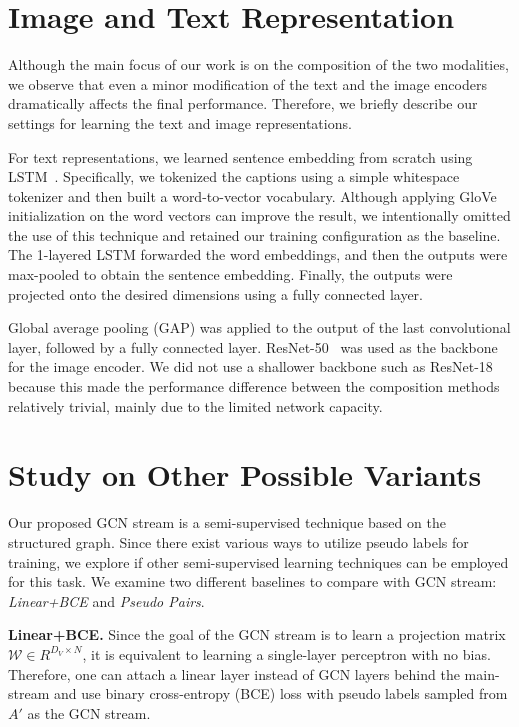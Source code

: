 \documentclass[10pt,twocolumn,letterpaper]{article}
\begin{document}
\section{Image and Text Representation}
Although the main focus of our work is on the composition of the two modalities, we observe that even a minor modification of the text and the image encoders dramatically affects the final performance. Therefore, we briefly describe our settings for learning the text and image representations.

For text representations, we learned sentence embedding from scratch using LSTM~\cite{hochreiter1997long}. Specifically, we tokenized the captions using a simple whitespace tokenizer and then built a word-to-vector vocabulary. Although applying GloVe~\cite{pennington2014glove} initialization on the word vectors can improve the result, we intentionally omitted the use of this technique and retained our training configuration as the baseline. The 1-layered LSTM forwarded the word embeddings, and then the outputs were max-pooled to obtain the sentence embedding. Finally, the outputs were projected onto the desired dimensions using a fully connected layer.

Global average pooling (GAP) was applied to the output of the last convolutional layer, followed by a fully connected layer. ResNet-50~\cite{he2016deep} was used as the backbone for the image encoder. We did not use a shallower backbone such as ResNet-18 because this made the performance difference between the composition methods relatively trivial, mainly due to the limited network capacity.

\section{Study on Other Possible Variants}
Our proposed GCN stream is a semi-supervised technique based on the structured graph. Since there exist various ways to utilize pseudo labels for training, we explore if other semi-supervised learning techniques can be employed for this task. We examine two different baselines to compare with GCN stream: \textit{Linear+BCE} and \textit{Pseudo Pairs}.

\noindent
\textbf{Linear+BCE.} Since the goal of the GCN stream is to learn a projection matrix $\mathcal{W} \in R^{D_V \times N}$, it is equivalent to learning a single-layer perceptron with no bias. Therefore, one can attach a linear layer instead of GCN layers behind the main-stream and use binary cross-entropy (BCE) loss with pseudo labels sampled from $A'$ as the GCN stream.
\end{document}

